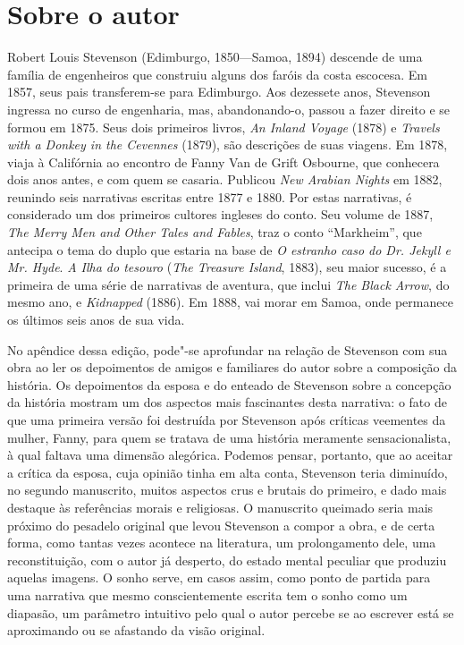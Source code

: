 
\section{Sobre o autor}

Robert Louis Stevenson (Edimburgo, 1850---Samoa, 1894) 
descende de uma família de engenheiros que construiu alguns dos 
faróis da costa escocesa. Em 1857, seus pais transferem-se para 
Edimburgo. Aos dezessete anos, Stevenson ingressa no curso de 
engenharia, mas, abandonando-o, passou a fazer direito e se formou em 1875. 
Seus dois primeiros livros, \textit{An Inland Voyage} (1878) e \textit{Travels with a Donkey in the Cevennes} (1879), são descrições de suas viagens. Em 1878, viaja 
à Califórnia ao encontro de Fanny Van de Grift Osbourne, que 
conhecera dois anos antes, e com quem se casaria. Publicou \textit{New 
Arabian Nights} em 1882, reunindo seis narrativas escritas 
entre 1877 e 1880. Por estas narrativas, é considerado um dos 
primeiros cultores ingleses do conto. Seu volume de 1887, 
\textit{The Merry Men and Other Tales and Fables}, traz o conto ``Markheim'', 
que antecipa o tema do duplo que estaria na base de \textit{O estranho caso 
do Dr. Jekyll e Mr. Hyde}. \textit{A Ilha do tesouro} (\textit{The Treasure Island}, 1883), seu maior sucesso, é a primeira de uma série de narrativas 
de aventura, que inclui \textit{The Black Arrow}, do mesmo ano, e \textit{Kidnapped} (1886). Em 1888, vai morar em Samoa, onde permanece os últimos seis anos de sua vida.


No apêndice dessa edição, pode"-se aprofundar na relação de Stevenson com sua obra ao ler os depoimentos de amigos e familiares do autor sobre a composição da história.
Os depoimentos da esposa e do enteado de Stevenson sobre a concepção da
história mostram um dos aspectos mais
fascinantes desta narrativa: o fato de que uma primeira versão foi
destruída por Stevenson após críticas veementes da mulher, Fanny, para
quem se tratava de uma história meramente sensacionalista, à qual
faltava uma dimensão alegórica.  Podemos pensar, portanto, que ao
aceitar a crítica da esposa, cuja opinião tinha em alta conta,
Stevenson teria diminuído, no segundo manuscrito, muitos aspectos crus
e brutais do primeiro, e dado mais destaque às referências morais e
religiosas.  O manuscrito queimado seria mais próximo do pesadelo
original que levou Stevenson a compor a obra, e de certa forma, como tantas vezes acontece na literatura,
um prolongamento dele, uma reconstituição, com o autor já desperto, do
estado mental peculiar que produziu aquelas imagens.  O sonho serve, em
casos assim, como ponto de partida para uma narrativa que mesmo
conscientemente escrita tem o sonho como um diapasão, um parâmetro
intuitivo pelo qual o autor percebe se ao escrever está se aproximando
ou se afastando da visão original.

